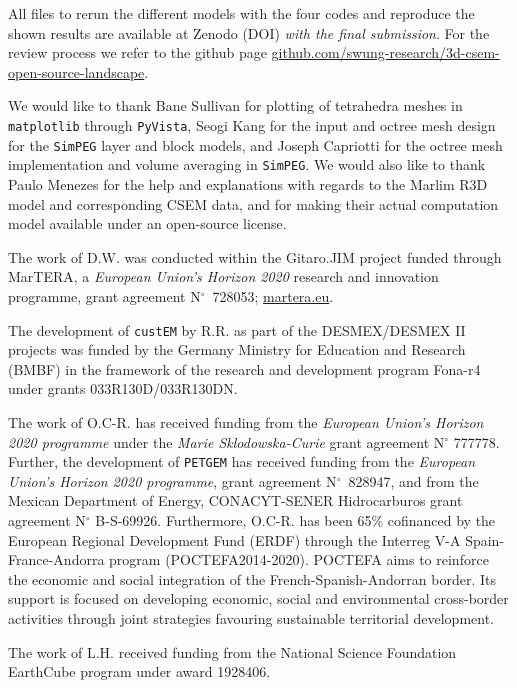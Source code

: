 \documentclass[onecolumn,extra,camera]{gji}
\newcommand{\simpeg}{\texttt{SimPEG}\xspace}
\newcommand{\custem}{\texttt{custEM}\xspace}
\newcommand{\petgem}{\texttt{PETGEM}\xspace}
\begin{document}
All files to rerun the different models with the four codes and reproduce the shown results are available at Zenodo (DOI) \emph{with the final submission}. For the review process we refer to the github page \href{https://github.com/swung-research/3d-csem-open-source-landscape}{github.com/swung-research/3d-csem-open-source-landscape}.


\begin{acknowledgments}

We would like to thank Bane Sullivan for plotting of tetrahedra meshes in \texttt{matplotlib} through \texttt{PyVista}, Seogi Kang for the input and octree mesh design for the \simpeg layer and block models, and Joseph Capriotti for the octree mesh implementation and volume averaging in \simpeg. We would also like to thank Paulo Menezes for the help and explanations with regards to the Marlim R3D model and corresponding CSEM data, and for making their actual computation model available under an open-source license.

The work of D.W. was conducted within the Gitaro.JIM project funded through MarTERA, a \emph{European Union's Horizon 2020} research and innovation programme, grant agreement N$^\circ$~728053; \href{https://www.martera.eu}{martera.eu}.

The development of \custem by R.R. as part of the DESMEX/DESMEX II projects was funded by the Germany Ministry for Education and Research (BMBF) in the framework of the research and development program Fona-r4 under grants 033R130D/033R130DN.

The work of O.C-R. has received funding from the \emph{European Union's Horizon 2020 programme} under the \emph{Marie Sklodowska-Curie} grant agreement N$^\circ$ 777778. Further, the development of \petgem has received funding from the \emph{European Union's Horizon 2020 programme}, grant agreement N$^\circ$~828947, and from the Mexican Department of Energy, CONACYT-SENER Hidrocarburos grant agreement N$^\circ$ B-S-69926. Furthermore, O.C-R. has been 65\% cofinanced by the European Regional Development Fund (ERDF) through the Interreg V-A Spain-France-Andorra program (POCTEFA2014-2020). POCTEFA aims to reinforce the economic and social integration of the French-Spanish-Andorran border. Its support is focused on developing economic, social and environmental cross-border activities through joint strategies favouring sustainable territorial development.

The work of L.H. received funding from the National Science Foundation EarthCube program under award 1928406.
\end{acknowledgments}




\label{lastpage}
\end{document}
